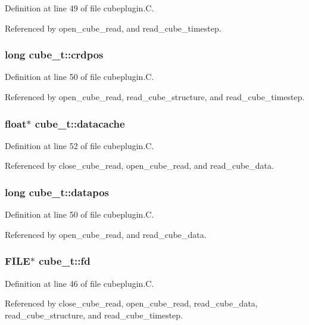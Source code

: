 Definition at line 49 of file cubeplugin.C.

Referenced by open\_\-cube\_\-read, and read\_\-cube\_\-timestep.
\subsubsection{\setlength{\rightskip}{0pt plus 5cm}long cube\_\-t::crdpos}\label{structcube__t_m4}




Definition at line 50 of file cubeplugin.C.

Referenced by open\_\-cube\_\-read, read\_\-cube\_\-structure, and read\_\-cube\_\-timestep.
\subsubsection{\setlength{\rightskip}{0pt plus 5cm}float$\ast$ cube\_\-t::datacache}\label{structcube__t_m7}




Definition at line 52 of file cubeplugin.C.

Referenced by close\_\-cube\_\-read, open\_\-cube\_\-read, and read\_\-cube\_\-data.
\subsubsection{\setlength{\rightskip}{0pt plus 5cm}long cube\_\-t::datapos}\label{structcube__t_m5}




Definition at line 50 of file cubeplugin.C.

Referenced by open\_\-cube\_\-read, and read\_\-cube\_\-data.
\subsubsection{\setlength{\rightskip}{0pt plus 5cm}FILE$\ast$ cube\_\-t::fd}\label{structcube__t_m0}




Definition at line 46 of file cubeplugin.C.

Referenced by close\_\-cube\_\-read, open\_\-cube\_\-read, read\_\-cube\_\-data, read\_\-cube\_\-structure, and read\_\-cube\_\-timestep.
